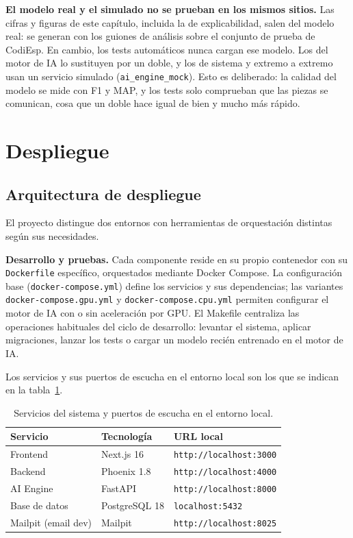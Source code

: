 \textbf{El modelo real y el simulado no se prueban en los mismos sitios.} Las cifras y figuras de este capítulo, incluida la de explicabilidad, salen del modelo real: se generan con los guiones de análisis sobre el conjunto de prueba de CodiEsp. En cambio, los tests automáticos nunca cargan ese modelo. Los del motor de IA lo sustituyen por un doble, y los de sistema y extremo a extremo usan un servicio simulado (\texttt{ai\_engine\_mock}). Esto es deliberado: la calidad del modelo se mide con F1 y MAP, y los tests solo comprueban que las piezas se comunican, cosa que un doble hace igual de bien y mucho más rápido.

\section{Despliegue}

\subsection{Arquitectura de despliegue}

El proyecto distingue dos entornos con herramientas de orquestación distintas según sus necesidades.

\textbf{Desarrollo y pruebas.} Cada componente reside en su propio contenedor con su \texttt{Dockerfile} específico, orquestados mediante Docker Compose. La configuración base (\texttt{docker-compose.yml}) define los servicios y sus dependencias; las variantes \texttt{docker-compose.\allowbreak{}gpu.yml} y \texttt{docker-compose.\allowbreak{}cpu.yml} permiten configurar el motor de IA con o sin aceleración por GPU. El Makefile centraliza las operaciones habituales del ciclo de desarrollo: levantar el sistema, aplicar migraciones, lanzar los tests o cargar un modelo recién entrenado en el motor de IA.

Los servicios y sus puertos de escucha en el entorno local son los que se indican en la tabla~\ref{tab:servicios-puertos}.

\begin{table}[!ht]
\centering
\caption{Servicios del sistema y puertos de escucha en el entorno local.}
\label{tab:servicios-puertos}
\begin{tabular}{lll}
\hline
\textbf{Servicio} & \textbf{Tecnología} & \textbf{URL local} \\
\hline
Frontend & Next.js 16 & \texttt{http://localhost:3000} \\
Backend & Phoenix 1.8 & \texttt{http://localhost:4000} \\
AI Engine & FastAPI & \texttt{http://localhost:8000} \\
Base de datos & PostgreSQL 18 & \texttt{localhost:5432} \\
Mailpit (email dev) & Mailpit & \texttt{http://localhost:8025} \\
\hline
\end{tabular}
\end{table}

